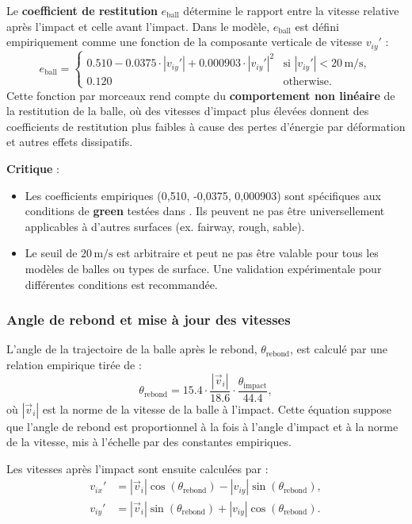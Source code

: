 \documentclass[10pt,a4paper]{report}
\begin{document}
Le \textbf{coefficient de restitution} $e_{\text{ball}}$ détermine le rapport entre la vitesse relative après l'impact et celle avant l'impact. Dans le modèle, $e_{\text{ball}}$ est défini empiriquement comme une fonction de la composante verticale de vitesse $v_{iy}'$ :
\[
e_{\text{ball}} =
\begin{cases}
0.510 - 0.0375 \cdot |v_{iy}'| + 0.000903 \cdot |v_{iy}'|^2 & \text{si } |v_{iy}'| < 20 \, \text{m/s}, \\
0.120 & \text{otherwise}.
\end{cases}
\]
Cette fonction par morceaux rend compte du \textbf{comportement non linéaire} de la restitution de la balle, où des vitesses d'impact plus élevées donnent des coefficients de restitution plus faibles à cause des pertes d'énergie par déformation et autres effets dissipatifs.

\textbf{Critique} :
\begin{itemize}
    \item Les coefficients empiriques (0{,}510, -0{,}0375, 0{,}000903) sont spécifiques aux conditions de \textbf{green} testées dans \cite{rwlc2010}. Ils peuvent ne pas être universellement applicables à d'autres surfaces (ex. fairway, rough, sable).
    \item Le seuil de $20 \, \text{m/s}$ est arbitraire et peut ne pas être valable pour tous les modèles de balles ou types de surface. Une validation expérimentale pour différentes conditions est recommandée.
\end{itemize}

\bigskip
\subsubsection{Angle de rebond et mise à jour des vitesses}
\label{subsubsec:bounce_angle}

L'angle de la trajectoire de la balle après le rebond, $\theta_{\text{rebond}}$, est calculé par une relation empirique tirée de \cite{rwlc2010} :
\[
\theta_{\text{rebond}} = 15.4 \cdot \frac{|\vec{v}_i|}{18.6} \cdot \frac{\theta_{\text{impact}}}{44.4},
\]
où $|\vec{v}_i|$ est la norme de la vitesse de la balle à l'impact. Cette équation suppose que l'angle de rebond est proportionnel à la fois à l'angle d'impact et à la norme de la vitesse, mis à l'échelle par des constantes empiriques.

Les vitesses après l'impact sont ensuite calculées par :
\[
\begin{aligned}
v_{ix}' &= |\vec{v}_i| \cos(\theta_{\text{rebond}}) - |v_{iy}| \sin(\theta_{\text{rebond}}), \\
v_{iy}' &= |\vec{v}_i| \sin(\theta_{\text{rebond}}) + |v_{iy}| \cos(\theta_{\text{rebond}}).
\end{aligned}
\]
\end{document}
